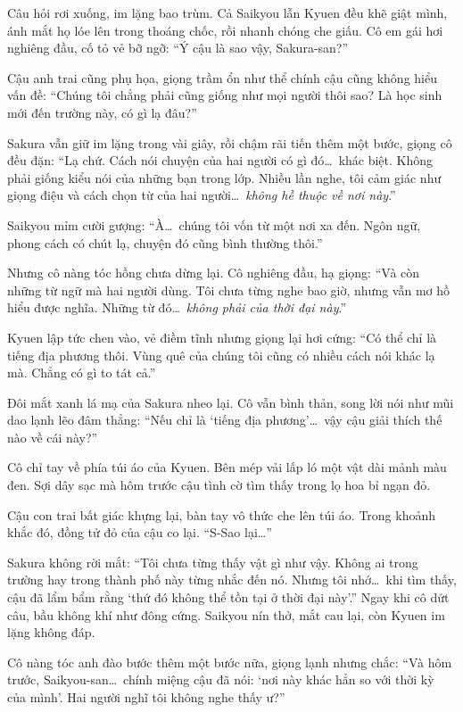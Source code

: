\documentclass[../main.tex]{subfiles}
\begin{document}
Câu hỏi rơi xuống, im lặng bao trùm. Cả Saikyou lẫn Kyuen đều khẽ giật mình, ánh mắt họ lóe lên trong thoáng chốc, rồi nhanh chóng che giấu. Cô em gái hơi nghiêng đầu, cố tỏ vẻ bỡ ngỡ: ``Ý cậu là sao vậy, Sakura-san?''

Cậu anh trai cũng phụ họa, giọng trầm ổn như thể chính cậu cũng không hiểu vấn đề: ``Chúng tôi chẳng phải cũng giống như mọi người thôi sao? Là học sinh mới đến trường này, có gì lạ đâu?''

Sakura vẫn giữ im lặng trong vài giây, rồi chậm rãi tiến thêm một bước, giọng cô đều đặn: ``Lạ chứ. Cách nói chuyện của hai người có gì đó\dots\ khác biệt. Không phải giống kiểu nói của những bạn trong lớp. Nhiều lần nghe, tôi cảm giác như giọng điệu và cách chọn từ của hai người\dots\ \emph{không hề thuộc về nơi này}.''

Saikyou mỉm cười gượng: ``À\dots\ chúng tôi vốn từ một nơi xa đến. Ngôn ngữ, phong cách có chút lạ, chuyện đó cũng bình thường thôi.''

Nhưng cô nàng tóc hồng chưa dừng lại. Cô nghiêng đầu, hạ giọng: ``Và còn những từ ngữ mà hai người dùng. Tôi chưa từng nghe bao giờ, nhưng vẫn mơ hồ hiểu được nghĩa. Những từ đó\dots\ \emph{không phải của thời đại này}.''

Kyuen lập tức chen vào, vẻ điềm tĩnh nhưng giọng lại hơi cứng: ``Có thể chỉ là tiếng địa phương thôi. Vùng quê của chúng tôi cũng có nhiều cách nói khác lạ mà. Chẳng có gì to tát cả.''

Đôi mắt xanh lá mạ của Sakura nheo lại. Cô vẫn bình thản, song lời nói như mũi dao lạnh lẽo đâm thẳng: ``Nếu chỉ là `tiếng địa phương'\dots\ vậy cậu giải thích thế nào về cái này?''

Cô chỉ tay về phía túi áo của Kyuen. Bên mép vải lấp ló một vật dài mảnh màu đen. Sợi dây sạc mà hôm trước cậu tình cờ tìm thấy trong lọ hoa bỉ ngạn đỏ.

Cậu con trai bất giác khựng lại, bàn tay vô thức che lên túi áo. Trong khoảnh khắc đó, đồng tử đỏ của cậu co lại. ``S-Sao lại\dots''

Sakura không rời mắt: ``Tôi chưa từng thấy vật gì như vậy. Không ai trong trường hay trong thành phố này từng nhắc đến nó. Nhưng tôi nhớ\dots\ khi tìm thấy, cậu đã lẩm bẩm rằng `thứ đó không thể tồn tại ở thời đại này'.'' Ngay khi cô dứt câu, bầu không khí như đông cứng. Saikyou nín thở, mắt cau lại, còn Kyuen im lặng không đáp.

Cô nàng tóc anh đào bước thêm một bước nữa, giọng lạnh nhưng chắc: ``Và hôm trước, Saikyou-san\dots\ chính miệng cậu đã nói: `nơi này khác hẳn so với thời kỳ của mình'. Hai người nghĩ tôi không nghe thấy ư?''
\end{document}
